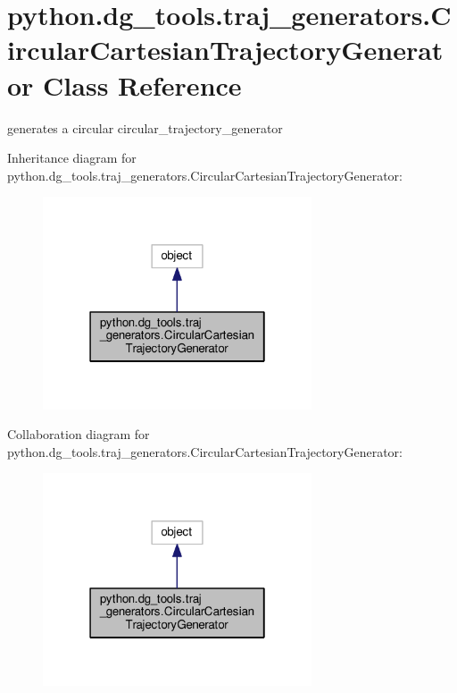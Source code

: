 \hypertarget{classpython_1_1dg__tools_1_1traj__generators_1_1CircularCartesianTrajectoryGenerator}{}\section{python.\+dg\+\_\+tools.\+traj\+\_\+generators.\+Circular\+Cartesian\+Trajectory\+Generator Class Reference}
\label{classpython_1_1dg__tools_1_1traj__generators_1_1CircularCartesianTrajectoryGenerator}


generates a circular circular\+\_\+trajectory\+\_\+generator  




Inheritance diagram for python.\+dg\+\_\+tools.\+traj\+\_\+generators.\+Circular\+Cartesian\+Trajectory\+Generator\+:
\nopagebreak
\begin{figure}[H]
\begin{center}
\leavevmode
\includegraphics[width=226pt]{classpython_1_1dg__tools_1_1traj__generators_1_1CircularCartesianTrajectoryGenerator__inherit__graph}
\end{center}
\end{figure}


Collaboration diagram for python.\+dg\+\_\+tools.\+traj\+\_\+generators.\+Circular\+Cartesian\+Trajectory\+Generator\+:
\nopagebreak
\begin{figure}[H]
\begin{center}
\leavevmode
\includegraphics[width=226pt]{classpython_1_1dg__tools_1_1traj__generators_1_1CircularCartesianTrajectoryGenerator__coll__graph}
\end{center}
\end{figure}
